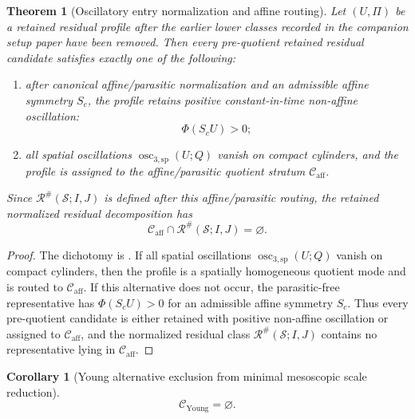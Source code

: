 \documentclass[11pt]{amsart}
\numberwithin{equation}{section}
\theoremstyle{plain}
\newtheorem{theorem}{Theorem}[section]
\newtheorem{corollary}[corollary]{Corollary}
\theoremstyle{definition}
\theoremstyle{remark}
\newcommand{\calS}{\mathcal S}
\newcommand{\calR}{\mathcal R}
\newcommand{\Caff}{\mathcal C_{\mathrm{aff}}}
\newcommand{\Cyoung}{\mathcal C_{\mathrm{Young}}}
\newcommand{\oscsp}{\operatorname{osc}_{3,\mathrm{sp}}}
\begin{document}
\begin{theorem}[Oscillatory entry normalization and affine routing]
\label{thm:oscillatory-entry-normalization}
Let \((U,\Pi)\) be a retained residual profile after the earlier lower classes
recorded in the companion setup paper have been removed.  Then every
pre-quotient retained residual candidate satisfies exactly one of the following:
\begin{enumerate}[label=\textup{(\roman*)}]
   \item after canonical affine/parasitic normalization and an admissible affine
   symmetry \(S_c\), the profile retains positive constant-in-time non-affine
   oscillation:
   \[
      \Phi(S_cU)>0;
   \]
   \item all spatial oscillations \(\oscsp(U;Q)\) vanish on compact cylinders,
   and the profile is assigned to the affine/parasitic quotient stratum
   \(\Caff\).
\end{enumerate}
Since \(\calR^\#(\calS;I,J)\) is defined after this affine/parasitic routing,
the retained normalized residual decomposition has
\[
   \Caff\cap\calR^\#(\calS;I,J)=\varnothing .
\]
\end{theorem}

\begin{proof}
The dichotomy is .  If all
spatial oscillations \(\oscsp(U;Q)\) vanish on compact cylinders, then the profile
is a spatially homogeneous quotient mode and is routed to \(\Caff\).  If this
alternative does not occur, the parasitic-free representative has
\(\Phi(S_cU)>0\) for an admissible affine symmetry \(S_c\).  Thus every
pre-quotient candidate is either retained with positive non-affine oscillation
or assigned to \(\Caff\), and the normalized residual class
\(\calR^\#(\calS;I,J)\) contains no representative lying in \(\Caff\).
\end{proof}

\begin{corollary}[Young alternative exclusion from minimal mesoscopic scale reduction]
\label{cor:young-branch-exclusion}
\[
   \Cyoung=\varnothing .
\]
\end{corollary}
\end{document}
